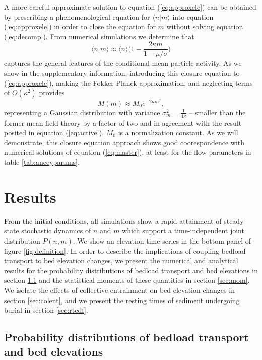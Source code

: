 A more careful approximate solution to equation (\ref{eq:approxele}) can be obtained by prescribing a phenomenological equation for $\langle n | m \rangle$ into equation (\ref{eq:approxele}) in order to close the equation for $m$ without solving equation (\ref{eq:decomp}).
From numerical simulations we determine that
\begin{equation}
	\langle n | m  \rangle \approx \langle n \rangle \Big( 1 - \frac{2\kappa m}{1-\mu/\sigma}\Big) \label{eq:closure}
\end{equation}
captures the general features of the conditional mean particle activity.
As we show in the supplementary information, introducing this closure equation to (\ref{eq:approxele}), making the Fokker-Planck approximation, and neglecting terms of $O(\kappa^2)$ provides 
\begin{equation} M(m) \approx M_0 e^{-2\kappa m^2}, \label{eq:ou2}\end{equation}
representing a Gaussian distribution with variance $\sigma_m^2 = \frac{1}{4\kappa}$ -- smaller than the former mean field theory by a factor of two and in agreement with the result posited in equation (\ref{eq:active}).
$M_0$ is a normalization constant. 
As we will demonstrate, this closure equation approach shows good coorespondence with numerical solutions of equation (\ref{eq:master}), at least for the flow parameters in table \ref{tab:anceyparams}.

\section{Results}
\label{sec:results}

From the initial conditions, all simulations show a rapid attainment of steady-state stochastic dynamics of $n$ and $m$ which support a time-independent joint distribution $P(n,m)$. We show an elevation time-series in the bottom panel of figure \ref{fig:definition}. In order to describe the implications of coupling bedload transport to bed elevation changes, we present the numerical and analytical results for the probability distributions of bedload transport and bed elevations in section \ref{sec:pdf} and the statistical moments of these quantities in section \ref{sec:mom}. We isolate the effects of collective entrainment on bed elevation changes in section \ref{sec:colent}, and we present the resting times of sediment undergoing burial in section \ref{sec:rtcdf}.

\subsection{Probability distributions of bedload transport and bed elevations}
\label{sec:pdf}


